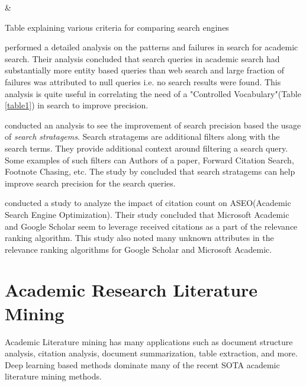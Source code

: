 \begin{table}[h]
    \label{table\arabic{tablecounter}}
            {\Criteria & \Meaning}
            \centering
            \caption{\label{tablecounter}Table explaining various criteria for comparing search engines}
\end{table}



\cite{li2017investigating} performed a detailed analysis on the patterns and failures in search for academic search. 
Their analysis concluded that search queries in academic search had substantially more entity based queries than web search and 
large fraction of failures was attributed to null queries i.e. no search results were found. 
This analysis is quite useful in correlating the need of a "Controlled Vocabulary"(Table \ref{table1}) in search to improve precision. 

\cite{kacem2018analysis} conducted an analysis to see the improvement of search precision based the usage of \textit{search stratagems}.
Search stratagems are additional filters along with the search terms. They provide additional context around filtering a search query. 
Some examples of such filters can Authors of a paper, Forward Citation Search, Footnote Chasing, etc.
The study by \cite{kacem2018analysis} concluded that search stratagems can help improve search precision for the search queries.

\cite{rovira2019ranking} conducted a study to analyze the impact of citation count on ASEO(Academic Search Engine Optimization). 
Their study concluded that Microsoft Academic and Google Scholar seem to leverage received citations as a part of the relevance 
ranking algorithm. This study also noted many unknown attributes in the relevance ranking algorithms for Google Scholar and Microsoft Academic.


\section{Academic Research Literature Mining}
Academic Literature mining has many applications such as document structure analysis, citation analysis, document summarization, table extraction, and more. Deep learning based methods dominate many of the recent SOTA academic literature mining methods. 

